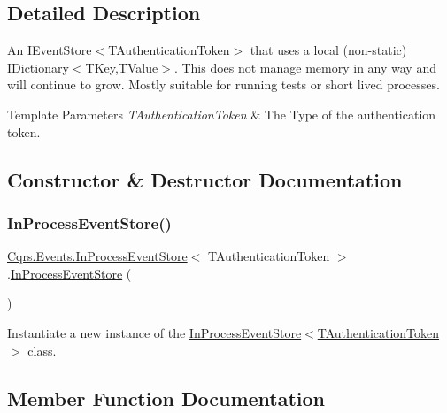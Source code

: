 \subsection{Detailed Description}
An I\+Event\+Store$<$\+T\+Authentication\+Token$>$ that uses a local (non-\/static) I\+Dictionary$<$\+T\+Key,\+T\+Value$>$. This does not manage memory in any way and will continue to grow. Mostly suitable for running tests or short lived processes. 


\begin{DoxyTemplParams}{Template Parameters}
{\em T\+Authentication\+Token} & The Type of the authentication token.\\
\hline
\end{DoxyTemplParams}


\subsection{Constructor \& Destructor Documentation}
\mbox{\label{classCqrs_1_1Events_1_1InProcessEventStore_a81534fc0086e307f46051c26111c47ab_a81534fc0086e307f46051c26111c47ab}} 
\subsubsection{\texorpdfstring{In\+Process\+Event\+Store()}{InProcessEventStore()}}
{\footnotesize\ttfamily \hyperlink{classCqrs_1_1Events_1_1InProcessEventStore}{Cqrs.\+Events.\+In\+Process\+Event\+Store}$<$ T\+Authentication\+Token $>$.\hyperlink{classCqrs_1_1Events_1_1InProcessEventStore}{In\+Process\+Event\+Store} (\begin{DoxyParamCaption}{ }\end{DoxyParamCaption})}



Instantiate a new instance of the \hyperlink{classCqrs_1_1Events_1_1InProcessEventStore_a81534fc0086e307f46051c26111c47ab_a81534fc0086e307f46051c26111c47ab}{In\+Process\+Event\+Store$<$\+T\+Authentication\+Token$>$} class. 



\subsection{Member Function Documentation}
\mbox{\label{classCqrs_1_1Events_1_1InProcessEventStore_ac588cacc020921c5120b290b95c641e7_ac588cacc020921c5120b290b95c641e7}} 
